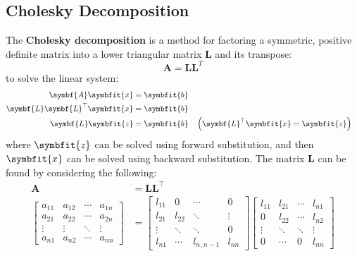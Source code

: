 \documentclass{article}
\begin{document}
\subsection{Cholesky Decomposition}
The \textbf{Cholesky decomposition} is a method for factoring a symmetric, positive definite matrix into a lower triangular matrix \(\symbf{L}\) and its transpose:
\begin{equation*}
    \symbf{A} = \symbf{L} \symbf{L}^T
\end{equation*}
to solve the linear system:
\begin{align*}
    \symbf{A} \symbfit{x} & = \symbfit{b} \\
    \symbf{L} \symbf{L}^\top \symbfit{x} & = \symbfit{b} \\
    \symbf{L} \symbfit{z} & = \symbfit{b} &  & \left( \symbf{L}^\top \symbfit{x} = \symbfit{z} \right)
\end{align*}
where \(\symbfit{z}\) can be solved using forward substitution, and then \(\symbfit{x}\) can be solved using backward substitution.
The matrix \(\symbf{L}\) can be found by considering the following:
\begin{align*}
    \symbf{A}                            & = \symbf{L} \symbf{L}^\top \\
    \begin{bmatrix*}
        a_{11} & a_{12} & \cdots & a_{1n} \\
        a_{21} & a_{22} & \cdots & a_{2n} \\
        \vdots & \vdots & \ddots & \vdots \\
        a_{n1} & a_{n2} & \cdots & a_{nn}
    \end{bmatrix*} & =
    \begin{bmatrix*}
        l_{11} & 0      & \cdots & 0      \\
        l_{21} & l_{22} & \ddots & \vdots      \\
        \vdots & \ddots & \ddots & 0 \\
        l_{n1} & \cdots & l_{n,n-1} & l_{nn}
    \end{bmatrix*}
    \begin{bmatrix*}
        l_{11} & l_{21} & \cdots & l_{n1} \\
        0      & l_{22} & \cdots & l_{n2} \\
        \vdots & \ddots & \ddots & \vdots \\
        0      & \cdots & 0      & l_{nn}
    \end{bmatrix*}
\end{align*}
\end{document}
